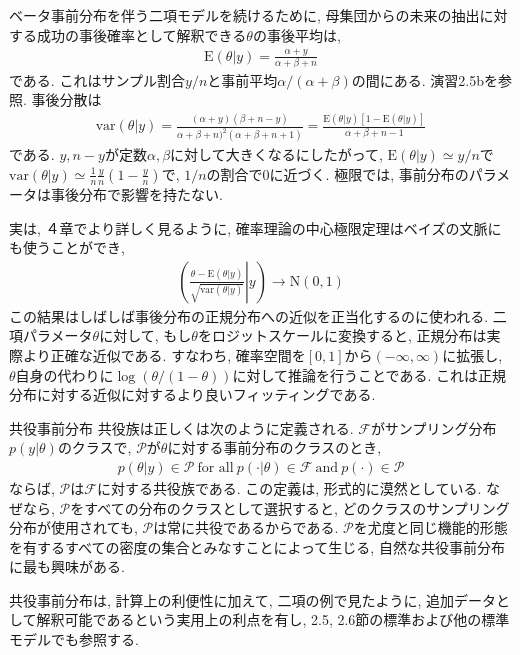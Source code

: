 \documentclass[10pt,dvipdfmx,a4]{beamer}
\newcommand{\eqn}[1]{\begin{align*}#1\end{align*}}
\begin{document}

\begin{frame}
ベータ事前分布を伴う二項モデルを続けるために, 母集団からの未来の抽出に対する成功の事後確率として解釈できる$\theta$の事後平均は,
\eqn{\text{E}(\theta|y)=\frac{\alpha+y}{\alpha+\beta+n}}
である.
これはサンプル割合$y/n$と事前平均$\alpha/(\alpha+\beta)$の間にある.
演習2.5bを参照.
事後分散は
\eqn{\text{var}(\theta|y)=\frac{(\alpha+y)(\beta+n-y)}{\alpha+\beta+n)^2(\alpha+\beta+n+1)}=\frac{\text{E}(\theta|y)[1-\text{E}(\theta|y)]}{\alpha+\beta+n-1}}
である.
$y, n-y$が定数$\alpha, \beta$に対して大きくなるにしたがって, $\text{E}(\theta|y)\simeq y/n$で$\text{var}(\theta|y)\simeq \tfrac{1}{n}\tfrac{y}{n}(1-\tfrac{y}{n})$で, $1/n$の割合で0に近づく.
極限では, 事前分布のパラメータは事後分布で影響を持たない.
\end{frame}


\begin{frame}
実は, ４章でより詳しく見るように, 確率理論の中心極限定理はベイズの文脈にも使うことができ,
\eqn{ \left( \left. \frac{\theta-\text{E}(\theta|y)}{\sqrt{\text{var}(\theta|y)}} \right| y \right) \rightarrow \text{N}(0,1)}
この結果はしばしば事後分布の正規分布への近似を正当化するのに使われる.
二項パラメータ$\theta$に対して, もし$\theta$をロジットスケールに変換すると, 正規分布は実際より正確な近似である.
すなわち, 確率空間を$[0,1]$から$(-\infty,\infty)$に拡張し, $\theta$自身の代わりに$\log (\theta/(1-\theta))$に対して推論を行うことである.
これは正規分布に対する近似に対するより良いフィッティングである.
\end{frame}


\begin{frame}{共役事前分布}
共役族は正しくは次のように定義される.
$\mathcal{F}$がサンプリング分布$p(y|\theta)$のクラスで, $\mathcal{P}$が$\theta$に対する事前分布のクラスのとき,
\eqn{p(\theta|y)\in\mathcal{P}\ \text{for all}\ p(\cdot|\theta)\in\mathcal{F}\ \text{and}\ p(\cdot)\in \mathcal{P}}
ならば, $\mathcal{P}$は$\mathcal{F}$に対する共役族である.
この定義は, 形式的に漠然としている.
なぜなら, $\mathcal{P}$をすべての分布のクラスとして選択すると, どのクラスのサンプリング分布が使用されても, $\mathcal{P}$は常に共役であるからである.
$\mathcal{P}$を尤度と同じ機能的形態を有するすべての密度の集合とみなすことによって生じる, 自然な共役事前分布に最も興味がある.

共役事前分布は, 計算上の利便性に加えて, 二項の例で見たように, 追加データとして解釈可能であるという実用上の利点を有し, 2.5, 2.6節の標準および他の標準モデルでも参照する.
\end{frame}
\end{document}
